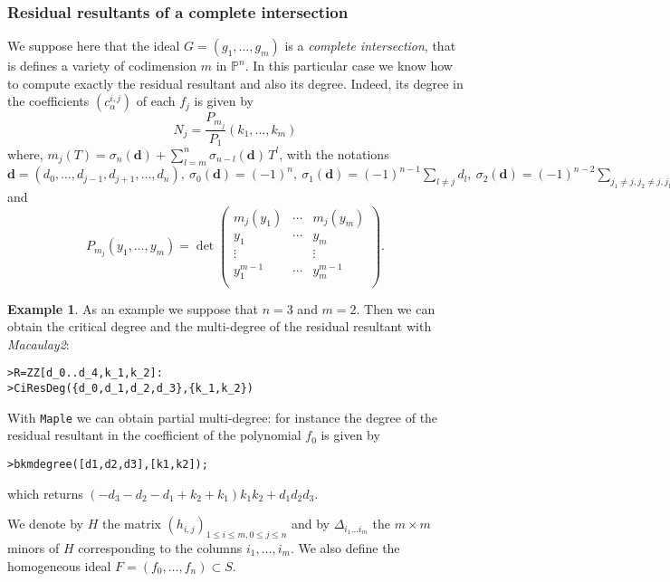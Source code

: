 \documentclass[10pt]{amsart}
\theoremstyle{plain}
\theoremstyle{definition}
\newtheorem{exmp}[thm]{Example}
\def\PP{{\mathbb{P}}}
\def\d{{\mathbf{d}}}
\begin{document}
\subsubsection{Residual resultants of a complete intersection}

We suppose here that the ideal $G=(g_1,\ldots,g_m)$ is a
\emph{complete intersection}, that is defines a variety of codimension
$m$ in $\PP^n$. In this particular case we know how to compute exactly the residual resultant and also its degree. Indeed, its degree in the coefficients $(c_{\alpha}^{i,j})$ of each
$f_j$ is given by
$$N_j = \frac{P_{m_{j}}}{P_1}(k_{1},\ldots, k_{m})$$
where, $m_{j}(T)
= \sigma_{n}(\d) + \sum_{l=m}^{n}\sigma_{n-l}(\d)\, T^{l}$, with the
notations $\d=(d_0,\ldots,d_{j-1},d_{j+1},\ldots,d_n), \ 
\sigma_0(\d)=(-1)^{n}, \ \sigma_1(\d)=(-1)^{n-1}\sum_{l\neq j}d_l, \ 
\sigma_2(\d)=(-1)^{n-2}\sum_{j_{1}\neq j, j_{2}\neq j,
  j_{1}<j_{2}}d_{j_{1}}d_{j_{2}}, \ \dots, \ 
\sigma_{n}(\d)=\prod_{l\neq j} d_l,$ and
$$P_{m_j}(y_{1},\ldots,y_{m}) =\det\left(
\begin{array}{ccc}
m_j(y_{1}) & \cdots & m_j(y_{m}) \\
y_{1}    & \cdots & y_{m} \\
\vdots   &        & \vdots \\
y_{1}^{m-1}    & \cdots & y_{m}^{m-1} \\
\end{array}
\right).$$


\begin{exmp}
 As an example we suppose that $n=3$ and $m=2$. Then we can obtain the critical degree and the multi-degree of the residual resultant with  \textit{Macaulay2}:
\begin{verbatim}
>R=ZZ[d_0..d_4,k_1,k_2]:
>CiResDeg({d_0,d_1,d_2,d_3},{k_1,k_2})
\end{verbatim}   
With {\tt Maple} we can obtain partial multi-degree: for instance the degree of the residual resultant in the coefficient of the polynomial $f_0$ is given by
\begin{verbatim}
>bkmdegree([d1,d2,d3],[k1,k2]);
\end{verbatim}   
which returns $(-d_3 - d_2 - d_1 + k_2 + k_1) k_1 k_2 + d_1 d_2 d_3$.
\end{exmp}

We denote by $H$ the matrix $(h_{i,j})_{1\leq i\leq m,0 \le j \le n}$
and by $\Delta_{i_{1}\ldots i_{m}}$ the $m\times m$ minors of $H$
corresponding to the columns $i_{1},\ldots, i_{m}$.  We also define the homogeneous ideal $F=(f_0,\ldots,f_n) \subset S$.
\end{document}
